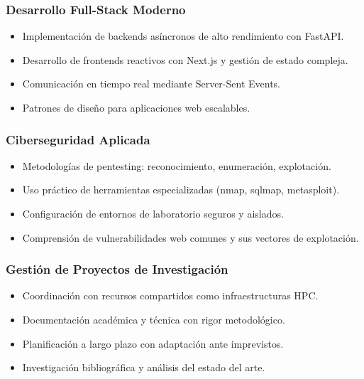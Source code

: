 \documentclass[12pt,a4paper]{article}
\begin{document}
\subsubsection{Desarrollo Full-Stack Moderno}

\begin{itemize}
    \item Implementación de backends asíncronos de alto rendimiento con FastAPI.
    \item Desarrollo de frontends reactivos con Next.js y gestión de estado compleja.
    \item Comunicación en tiempo real mediante Server-Sent Events.
    \item Patrones de diseño para aplicaciones web escalables.
\end{itemize}

\subsubsection{Ciberseguridad Aplicada}

\begin{itemize}
    \item Metodologías de pentesting: reconocimiento, enumeración, explotación.
    \item Uso práctico de herramientas especializadas (nmap, sqlmap, metasploit).
    \item Configuración de entornos de laboratorio seguros y aislados.
    \item Comprensión de vulnerabilidades web comunes y sus vectores de explotación.
\end{itemize}

\subsubsection{Gestión de Proyectos de Investigación}

\begin{itemize}
    \item Coordinación con recursos compartidos como infraestructuras HPC.
    \item Documentación académica y técnica con rigor metodológico.
    \item Planificación a largo plazo con adaptación ante imprevistos.
    \item Investigación bibliográfica y análisis del estado del arte.
\end{itemize}

\newpage
\end{document}
